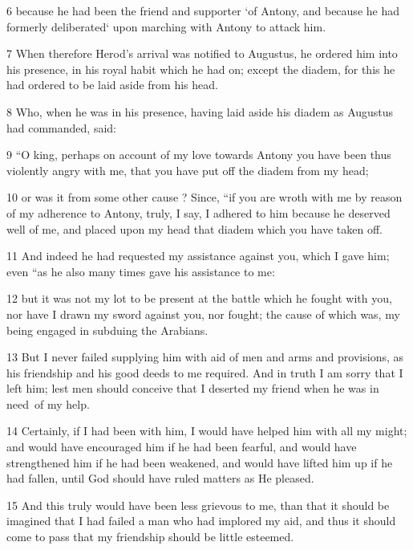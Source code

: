 \par 6 because he had been the friend and supporter ‘of Antony, and because he had formerly deliberated‘ upon marching with Antony to attack him. 

\par 7 When therefore Herod’s arrival was notified to Augustus, he ordered him into his presence, in his royal habit which he had on; except the diadem, for this he had ordered to be laid aside from his head. 

\par 8 Who, when he was in his presence, having laid aside his diadem as Augustus had commanded, said: 

\par 9 “O king, perhaps on account of my love towards Antony you have been thus violently angry with me, that you have put off the diadem from my head; 

\par 10 or was it from some other cause ? Since, “if you are wroth with me by reason of my adherence to Antony, truly, I say, I adhered to him because he deserved well of me, and placed upon my head that diadem which you have taken off. 

\par 11 And indeed he had requested my assistance against you, which I gave him; even “as he also many times gave his assistance to me: 

\par 12 but it was not my lot to be present at the battle which he fought with you, nor have I drawn my sword against you, nor fought; the cause of which was, my being engaged in subduing the Arabians. 

\par 13 But I never failed supplying him with aid of men and arms and provisions, as his friendship and his good deeds to me required. And in truth I am sorry that I left him; lest men should conceive that I deserted my friend when he was in need~of my help. 

\par 14 Certainly, if I had been with him, I would have helped him with all my might; and would have encouraged him if he had been fearful, and would have strengthened him if he had been weakened, and would have lifted him up if he had fallen, until God should have ruled matters as He pleased. 

\par 15 And this truly would have been less grievous to me, than that it should be imagined that I had failed a man who had implored my aid, and thus it should come to pass that my friendship should be little esteemed. 

